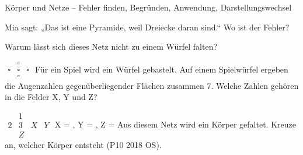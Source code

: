 \begin{aufgabe}{Körper und Netze – Fehler finden, Begründen, Anwendung, Darstellungswechsel}
\begin{teile}
\teil Mia sagt: „Das ist eine Pyramide, weil Dreiecke daran sind.“ Wo ist der Fehler?

\teil Warum lässt sich dieses Netz nicht zu einem Würfel falten?

$\begin{array}{ccc}  & \square &  \\ \square & \square & \square \\  & \square &  \end{array}$
\teil Für ein Spiel wird ein Würfel gebastelt. Auf einem Spielwürfel ergeben die Augenzahlen gegenüberliegender Flächen zusammen $7$. Welche Zahlen gehören in die Felder X, Y und Z?

$\begin{array}{cccc}  & 1 &  &  \\ 2 & 3 & X & Y \\  & Z &  &  \end{array}$
X = \leerfeld , Y = \leerfeld , Z = \leerfeld
\teil Aus diesem Netz wird ein Körper gefaltet. Kreuze an, welcher Körper entsteht \hfill (P10 2018 OS). \\  \\  \\ 

\end{teile}
\end{aufgabe}
